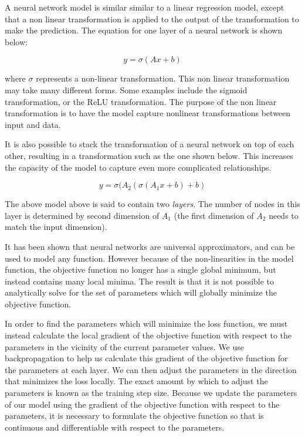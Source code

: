 A neural network model is similar similar to a linear regression model, except that a non linear transformation is applied to the output of the transformation to make the prediction. The equation for one layer of a neural network is shown below:

\begin{equation}
y = \sigma( Ax + b)
\end{equation}

where $\sigma$ represents a non-linear transformation. This non linear transformation may take many different forms. Some examples include the sigmoid transformation, or the ReLU transformation.\cite{} The purpose of the non linear transformation is to have the model capture nonlinear transformations between input and data.

It is also possible to stack the transformation of a neural network on top of each other, resulting in a transformation such as the one shown below. This increases the capacity of the model to capture even more complicated relationships. 

\begin{equation}
y = \sigma( A_2 ( \sigma(A_1 x + b) + b)
\end{equation}

The above model above is said to contain two \textit{layers}. The number of nodes in this layer is determined by second dimension of $A_1$ (the first dimension of $A_2$ needs to match the input dimension).

It has been shown that neural networks are universal approximators, and can be used to model any function.\cite{} However because of the non-linearities in the model function, the objective function no longer has a single global minimum, but instead contains many local minima. The result is that it is not possible to analytically solve for the set of parameters which will globally minimize the objective function.

In order to find the parameters which will minimize the loss function, we must instead calculate the local gradient of the objective function with respect to the parameters in the vicinity of the current parameter values. We use backpropagation\cite{Schmidhuber_NN_Overview} to help us calculate this gradient of the objective function for the parameters at each layer. We can then adjust the parameters in the direction that minimizes the loss locally. The exact amount by which to adjust the parameters is known as the training step size. Because we update the parameters of our model using the gradient of the objective function with respect to the parameters, it is necessary to formulate the objective function so that is continuous and differentiable with respect to the parameters.

